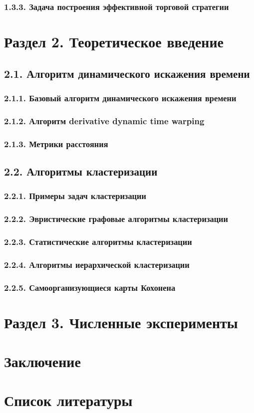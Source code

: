 \documentclass[12pt]{article}
\begin{document}
\subsubsection{1.3.3. Задача построения эффективной торговой стратегии}
\section{Раздел 2. Теоретическое введение}
\subsection{2.1. Алгоритм динамического искажения времени}
\subsubsection{2.1.1. Базовый алгоритм динамического искажения времени}
\subsubsection{2.1.2. Алгоритм derivative dynamic time warping}
\subsubsection{2.1.3. Метрики расстояния}
\newpage{}
\subsection{2.2. Алгоритмы кластеризации}
\subsubsection{2.2.1. Примеры задач кластеризации}
\subsubsection{2.2.2. Эвристические графовые алгоритмы кластеризации}
\subsubsection{2.2.3. Статистические алгоритмы кластеризации}
\subsubsection{2.2.4. Алгоритмы иерархической кластеризации}
\subsubsection{2.2.5. Самоорганизующиеся карты Кохонена}
\section{Раздел 3. Численные эксперименты}
\section{Заключение}
\section{Список литературы}
\end{document}
